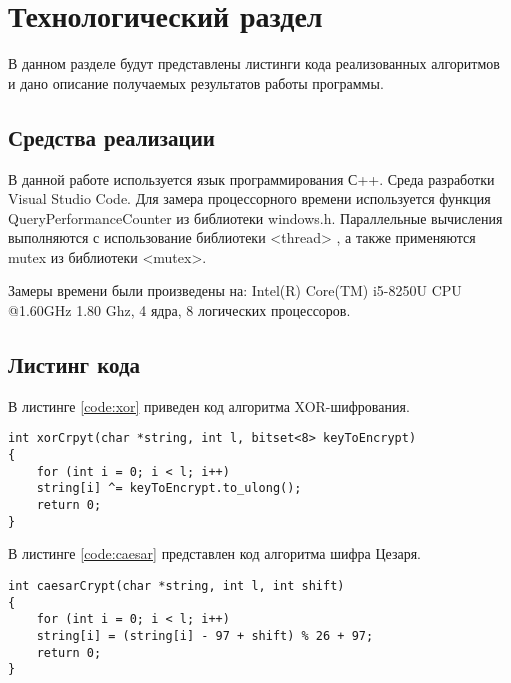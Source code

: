\chapter{Технологический раздел}
\label{cha:impl}
В данном разделе будут представлены листинги кода реализованных алгоритмов и дано описание получаемых результатов работы программы.

\section{Средства реализации}
В данной работе используется язык программирования С++. Среда разработки Visual Studio Code. Для замера процессорного времени используется функция QueryPerformanceCounter из библиотеки windows.h. Параллельные вычисления выполняются с использование библиотеки <thread> \cite{threads}, а также применяются mutex из библиотеки <mutex>.
\par Замеры времени были произведены на: Intel(R) Core(TM) i5-8250U CPU @1.60GHz 1.80 Ghz, 4 ядра, 8 логических процессоров.

\section{Листинг кода}
В листинге \ref{code:xor} приведен код алгоритма XOR-шифрования.
\begin{lstlisting}[caption= Алгоритм XOR-шифра, label=code:xor]
int xorCrpyt(char *string, int l, bitset<8> keyToEncrypt)
{
	for (int i = 0; i < l; i++)
	string[i] ^= keyToEncrypt.to_ulong();
	return 0;
}
\end{lstlisting}

\par В листинге \ref{code:caesar} представлен код алгоритма шифра Цезаря.
\begin{lstlisting}[caption= Алгоритм шифра Цезаря, label=code:caesar]
int caesarCrypt(char *string, int l, int shift)
{
	for (int i = 0; i < l; i++)
	string[i] = (string[i] - 97 + shift) % 26 + 97;
	return 0;
}
\end{lstlisting}

